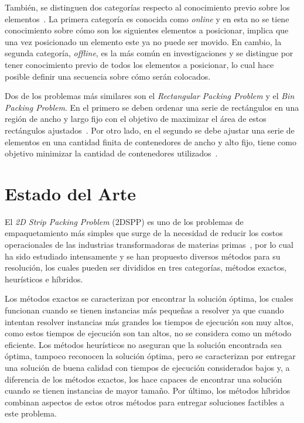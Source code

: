 \documentclass[letter, 10pt]{article}
\begin{document}
Tambi\'en, se distinguen dos categor\'ias respecto al conocimiento previo sobre los elementos~\cite{oliveira2016survey}. La primera categor\'ia es conocida como \emph{online} y en esta no se tiene conocimiento sobre c\'omo son los siguientes elementos a posicionar, implica que una vez posicionado un elemento este ya no puede ser movido. En cambio, la segunda categor\'ia, \emph{offline}, es la m\'as com\'un en investigaciones y se distingue por tener conocimiento previo de todos los elementos a posicionar, lo cual hace posible definir una secuencia sobre c\'omo ser\'an colocados.

Dos de los problemas m\'as similares son el \emph{Rectangular Packing Problem} y el \emph{Bin Packing Problem}. En el primero se deben ordenar una serie de rect\'angulos en una regi\'on de ancho y largo fijo con el objetivo de maximizar el \'area de estos rect\'angulos ajustados~\cite{chen2007two}. Por otro lado, en el segundo se debe ajustar una serie de elementos en una cantidad finita de contenedores de ancho y alto fijo, tiene como objetivo minimizar la cantidad de contenedores utilizados~\cite{lodi2002two}.

\section{Estado del Arte}

El \emph{2D Strip Packing Problem} (2DSPP) es uno de los problemas de empaquetamiento m\'as simples que surge de la necesidad de reducir los costos operacionales de las industrias transformadoras de materias primas~\cite{junior2022rectangular}, por lo cual ha sido estudiado intensamente y se han propuesto diversos m\'etodos para su resoluci\'on, los cuales pueden ser divididos en tres categor\'ias, m\'etodos exactos, heur\'isticos e h\'ibridos.

Los m\'etodos exactos se caracterizan por encontrar la soluci\'on \'optima, los cuales funcionan cuando se tienen instancias m\'as peque\~nas a resolver ya que cuando intentan resolver instancias m\'as grandes los tiempos de ejecuci\'on son muy altos, como estos tiempos de ejecuci\'on son tan altos, no se considera como un m\'etodo eficiente. Los m\'etodos heur\'isticos no aseguran que la soluci\'on encontrada sea \'optima, tampoco reconocen la soluci\'on \'optima, pero se caracterizan por entregar una soluci\'on de buena calidad con tiempos de ejecuci\'on considerados bajos y, a diferencia de los m\'etodos exactos, los hace capaces de encontrar una soluci\'on cuando se tienen instancias de mayor tama\~no. Por \'ultimo, los m\'etodos h\'ibridos combinan aspectos de estos otros m\'etodos para entregar soluciones factibles a este problema.
\end{document}
